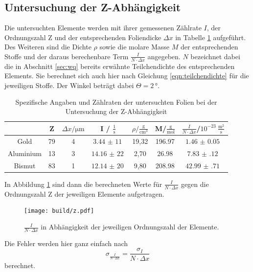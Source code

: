 \subsection{Untersuchung der Z-Abhängigkeit}
Die untersuchten Elemente werden mit ihrer gemessenen Zählrate $I$, der Ordnungszahl Z und der entsprechenden
Foliendicke $\Delta x$ in Tabelle \ref{tab:stoffe} aufgeführt. Des Weiteren sind die Dichte $\rho$ sowie die
molare Masse $M$ der entsprechenden Stoffe und der daraus berechenbare Term $\frac{I}{N\cdot \Delta x}$
angegeben. $N$ bezeichnet dabei die in Abschnitt \ref{sec:wq} bereits erwähnte Teilchendichte des entsprechenden Elements.
Sie berechnet sich auch hier nach Gleichung \ref{eqn:teilchendichte} für die jeweiligen Stoffe.
Der Winkel beträgt dabei $\Theta = 2 \, °$.
\begin{table}[H]
  \centering
  \caption{Spezifische Angaben und Zählraten der untersuchten Folien bei der Untersuchung der Z-Abhängigkeit \cite{sample}}
  \label{tab:stoffe}
  \begin{tabular}{c c c c c c c}
    \toprule
     & Z & $\Delta x/ \mathrm{\mu m}$ & I / $\frac{1}{\mathrm{s}}$ & $\rho/ \mathrm{\frac{g}{cm^3}}$ & M/$\mathrm{\frac{g}{mol}}$ & $\frac{I}{N\cdot \Delta x}$/$ 10^{-23}\ \mathrm{\frac{m^2}{s}}$ \\
    \midrule
    Gold & 79 & 4 & $\SI{3,44(11)}{}$ & 19,32 & 196.97 & $\SI{1.46(5)}{}$ \\
    Aluminium & 13 & 3 & $\SI{14,16(22)}{}$ & 2,70 & 26.98 & $\SI{7.83(12)}{}$ \\
    Bismut & 83 & 1 & $\SI{12,14(20)}{}$ & 9,80 & 208.98 & $\SI{42.99(71)}{}$ \\
    \bottomrule
  \end{tabular}
\end{table}

In Abbildung \ref{fig:zmessung} sind dann die berechneten Werte für $\frac{I}{N\cdot \Delta x}$
gegen die Ordnungszahl Z der jeweiligen Elemente aufgetragen.

\begin{figure}[H]
  \centering
  \texttt{[image: build/z.pdf]}
  \caption{$\frac{I}{N\cdot \Delta x}$ in Abhängigkeit der jeweiligen Ordnungszahl der Elemente.}
  \label{fig:zmessung}
\end{figure}

Die Fehler werden hier ganz einfach nach
\begin{equation*}
  \sigma_{\frac{I}{N\cdot \Delta x}} = \frac{\sigma_I}{N\cdot \Delta x}
\end{equation*}
berechnet.
